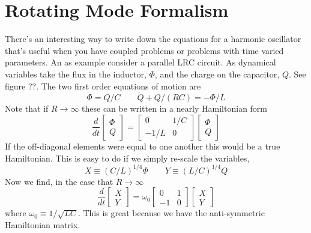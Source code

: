 \documentclass{article}
\begin{document}
\section{Rotating Mode Formalism}

There's an interesting way to write down the equations for a harmonic oscillator that's useful when you have coupled problems or problems with time varied parameters.
An as example consider a parallel LRC circuit.
As dynamical variables take the flux in the inductor, $\Phi$, and the charge on the capacitor, $Q$.
See figure ??.
The two first order equations of motion are\begin{equation}
\dot{\Phi}=Q/C\qquad\dot{Q}+Q/(RC)=-\Phi/L \end{equation}
Note that if $R\rightarrow\infty$ these can be written in a nearly Hamiltonian form \begin{equation}
\frac{d}{dt}\left[ \begin{array}{c} \Phi \\ Q\end{array} \right] =
\left[\begin{array}{cc} 0 & 1/C \\ -1/L & 0 \end{array} \right]
\left[\begin{array}{c} \Phi\\ Q\end{array}\right] \end{equation}
If the off-diagonal elements were equal to one another this would be a true Hamiltonian.
This is easy to do if we simply re-scale the variables, \begin{equation}
X \equiv \left( C/L \right)^{1/4} \Phi \qquad Y \equiv \left( L/C \right)^{1/4} Q \end{equation}
Now we find, in the case that $R\rightarrow\infty$ \begin{displaymath}
\frac{d}{dt}\left[ \begin{array}{c} X \\ Y \end{array} \right] = \omega_{0} \left[ \begin{array}{cc} 0 & 1 \\ -1 & 0 \end{array}\right]
\left[ \begin{array}{c} X \\ Y \end{array} \right] \end{displaymath}
where $\omega_{0}\equiv1/\sqrt{LC}$.
This is great because we have the anti-symmetric Hamiltonian matrix.
\end{document}
